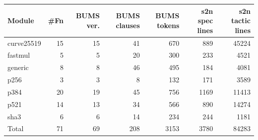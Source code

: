 \begin{tabular}{lrrrrrr}
\toprule
Module & \#Fn & BUMS ver. & BUMS clauses & BUMS tokens & s2n spec lines & s2n tactic lines\\
\midrule
curve25519 & 15 & 15 & 41 & 670 & 889 & 45224\\
fastmul & 5 & 5 & 20 & 300 & 233 & 4521\\
generic & 8 & 8 & 46 & 495 & 184 & 4081\\
p256 & 3 & 3 & 8 & 132 & 171 & 3589\\
p384 & 20 & 19 & 45 & 756 & 1169 & 11413\\
p521 & 14 & 13 & 34 & 566 & 890 & 14274\\
sha3 & 6 & 6 & 14 & 234 & 244 & 1181\\
\midrule
Total & 71 & 69 & 208 & 3153 & 3780 & 84283\\
\bottomrule
\end{tabular}
